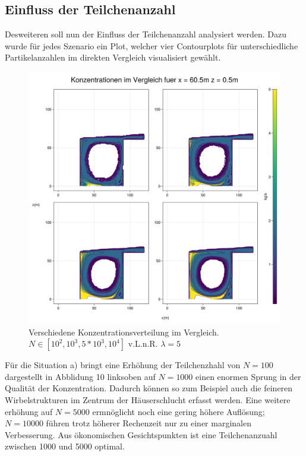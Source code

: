\documentclass[ngerman]{scrartcl}
\begin{document}
\subsection{Einfluss der Teilchenanzahl}
Desweiteren soll nun der Einfluss der Teilchenanzahl analysiert werden. Dazu wurde für jedes Szenario ein Plot, welcher vier Contourplots für unterschiedliche Partikelanzahlen im direkten Vergleich visualisiert gewählt.
\begin{figure}[H]
	\centering
	\includegraphics[scale=0.25]{Bilder/3_vergleich_x = 60.5.png}
	\caption{ Verschiedene Konzentrationsverteilung im Vergleich. $N \in[10^2,10^3,5 *10^3,10^4]$ v.L.n.R.  $\lambda =5$}
	\label{fig:my_label}
\end{figure}
Für die Situation a) bringt eine Erhöhung der Teilchenzhahl von $ N=100$ dargestellt in Abblidung 10 linksoben auf  $ N=1000$ einen enormen Sprung in der Qualität der Konzentration. Dadurch können so zum Beispiel auch die feineren Wirbelstrukturen im Zentrum der Häuserschlucht erfasst werden. Eine weitere erhöhung auf $N=5000$ ermnöglicht  noch eine gering höhere Auflösung; $N=10000$ führen trotz höherer Rechenzeit nur zu einer marginalen Verbesserung. Aus ökonomischen Gesichtspunkten ist eine Teilchenanzuahl zwischen 1000 und 5000 optimal.
\end{document}
